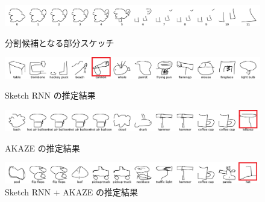 \documentclass[twocolumn]{jarticle}     %
\begin{document}
\begin{figure}[tb]

 \begin{minipage}{1\hsize}
 	\begin{center}
 		\includegraphics[clip,width=170mm]{origin.png}
 		\caption{分割候補となる部分スケッチ}
 		\label{fig:exp2_o}
 	\end{center}
 \end{minipage}
\vspace{2zh}

  \begin{minipage}{1\hsize}
  	\begin{center}
  		\includegraphics[clip,width=170mm]{sheep_a.png}
  		\caption{Sketch RNN の推定結果}
  		\label{fig:exp2_a}
  	\end{center}
  \end{minipage}
 \vspace{1.5zh}

   \begin{minipage}{1\hsize}
     \begin{center}
       \includegraphics[clip,width=170mm]{sheep_b.png}
       \caption{AKAZE の推定結果}
       \label{fig:exp2_b}
     \end{center}
   \end{minipage}
  \vspace{1.5zh}

    \begin{minipage}{1\hsize}
      \begin{center}
        \includegraphics[clip,width=170mm]{sheep_c.png}
        \caption{Sketch RNN + AKAZE の推定結果}
        \label{fig:exp2_c}
      \end{center}
    \end{minipage}

    \vspace{1zh}

\end{figure}
\end{document}
